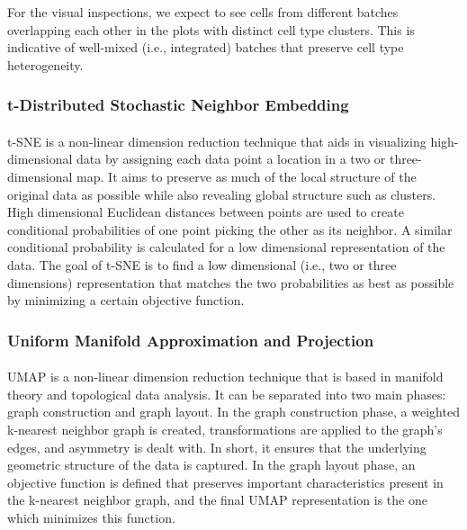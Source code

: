 \documentclass[
12pt, %
letterpaper, %
oneside, %
headinclude,footinclude, %
BCOR5mm, %
]{scrartcl}
\begin{document}
For the visual inspections, we expect to see cells from different batches overlapping each other in the plots with distinct cell type clusters. This is indicative of well-mixed (i.e., integrated) batches that preserve cell type heterogeneity.

\subsubsection*{t-Distributed Stochastic Neighbor Embedding}

\paragraph*{}
t-SNE is a non-linear dimension reduction technique \citep{van2008visualizing} that aids in visualizing high-dimensional data by assigning each data point a location in a two or three-dimensional map. It aims to preserve as much of the local structure of the original data as possible while also revealing global structure such as clusters. High dimensional Euclidean distances between points are used to create conditional probabilities of one point picking the other as its neighbor. A similar conditional probability is calculated for a low dimensional representation of the data. The goal of t-SNE is to find a low dimensional (i.e., two or three dimensions) representation that matches the two probabilities as best as possible by minimizing a certain objective function.

\subsubsection*{Uniform Manifold Approximation and Projection}

\paragraph*{}
UMAP is a non-linear dimension reduction technique \citep{mcinnes2018umap} that is based in manifold theory and topological data analysis. It can be separated into two main phases: graph construction and graph layout. In the graph construction phase, a weighted k-nearest neighbor graph is created, transformations are applied to the graph's edges, and asymmetry is dealt with. In short, it ensures that the underlying geometric structure of the data is captured. In the graph layout phase, an objective function is defined that preserves important characteristics present in the k-nearest neighbor graph, and the final UMAP representation is the one which minimizes this function.
\end{document}
